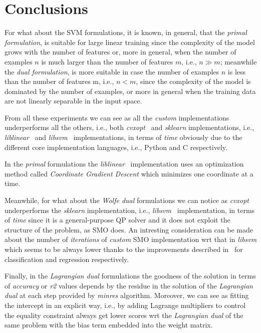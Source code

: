 \section{Conclusions}

For what about the SVM formulations, it is known, in general, that the \emph{primal formulation}, is suitable for large linear training since the complexity of the model grows with the number of features or, more in general, when the number of examples $n$ is much larger than the number of features $m$, i.e., $n \gg m$; meanwhile the \emph{dual formulation}, is more suitable in case the number of examples $n$ is less than the number of features m, i.e., $n < m$, since the complexity of the model is dominated by the number of examples, or more in general when the training data are not linearly separable in the input space.

\bigskip

From all these experiments we can see as all the \emph{custom} implementations underperforms all the others, i.e., both \emph{cvxopt}~\cite{vandenberghe2010cvxopt} and \emph{sklearn} implementations, i.e., \emph{liblinear}~\cite{fan2008liblinear} and \emph{libsvm}~\cite{chang2011libsvm} implementations, in terms of \emph{time} obviously due to the different core implementation languages, i.e., Python and C respectively.

In the \emph{primal} formulations the \emph{liblinear}~\cite{fan2008liblinear} implementation uses an optimization method called \emph{Coordinate Gradient Descent} which minimizes one coordinate at a time.

Meanwhile, for what about the \emph{Wolfe dual} formulations we can notice as \emph{cvxopt}~\cite{vandenberghe2010cvxopt} underperforms the \emph{sklearn} implementation, i.e., \emph{libsvm}~\cite{chang2011libsvm} implementation, in terms of \emph{time} since it is a general-purpose QP solver and it does not exploit the structure of the problem, as SMO does. An intresting consideration can be made about the number of \emph{iterations} of \emph{custom} SMO implementation wrt that in \emph{libsvm} which seems to be always lower thanks to the improvements described in~\cite{keerthi2001improvements, shevade1999improvements} for classification and regression respectively.

Finally, in the \emph{Lagrangian dual} formulations the goodness of the solution in terms of \emph{accuracy} or \emph{r2} values depends by the residue in the solution of the \emph{Lagrangian dual} at each step provided by \emph{minres} algorithm. Moreover, we can see as fitting the intercept in an explicit way, i.e., by adding Lagrange multipliers to control the equality constraint always get lower scores wrt the \emph{Lagrangian dual} of the same problem with the bias term embedded into the weight matrix.

